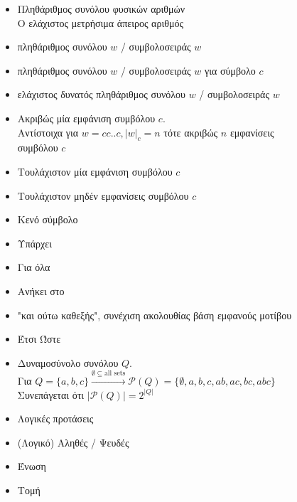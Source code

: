 \begin{itemize}
	\item{ Πληθάριθμος συνόλου φυσικών αριθμών\\
		\makebox[2.14cm]{\hfill}Ο ελάχιστος μετρήσιμα άπειρος αριθμός}
	\item{ πληθάριθμος συνόλου $w$ / συμβολοσειράς $w$}
	\item{ πληθάριθμος συνόλου $w$ / συμβολοσειράς $w$ για σύμβολο $c$}
	\item{ ελάχιστος δυνατός πληθάριθμος συνόλου $w$ / συμβολοσειράς $w$}
	\item{ Ακριβώς μία εμφάνιση συμβόλου $c$.\\
		\makebox[2.14cm]{\hfill}Αντίστοιχα για $w = cc..c, \vert w \vert_c = n$ τότε ακριβώς $n$ εμφανίσεις\\
		\makebox[2.14cm]{\hfill}συμβόλου $c$}
	\item{ Τουλάχιστον μία εμφάνιση συμβόλου $c$}
	\item{ Τουλάχιστον μηδέν εμφανίσεις συμβόλου $c$}
	\item{ Κενό σύμβολο}
	\item{\makebox[2cm]{$\exists$ \hfill} Υπάρχει}
	\item{\makebox[2cm]{$\forall$ \hfill} Για όλα}
	\item{\makebox[2cm]{$\in$ \hfill} Ανήκει στο}
	\item{\makebox[2cm]{$\dots$ \hfill} "και ούτω καθεξής", συνέχιση ακολουθίας βάση εμφανούς μοτίβου}
	\item{ Έτσι Ώστε}
	\item{ Δυναμοσύνολο συνόλου $Q$.\\
		\makebox[2.14cm]{\hfill}Για $Q = \{a, b, c\} \overset{\emptyset \subseteq \text{all sets}}{\rightarrow}
		\mathcal{P}(Q) = \{\emptyset, a, b, c, ab, ac, bc, 	abc\}$\\
		\makebox[2.14cm]{\hfill}Συνεπάγεται ότι $\vert\mathcal{P}(Q)\vert = 2^{\vert Q\vert}$}
	\item{ Λογικές προτάσεις}
	\item{ (Λογικό) Αληθές / Ψευδές}
	\item{\makebox[2cm]{$\cup$ \hfill} Ένωση}
	\item{\makebox[2cm]{$\cap$ \hfill} Τομή}

\end{itemize}
